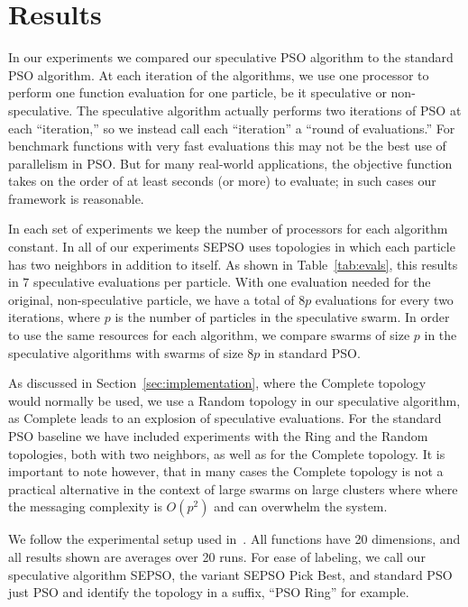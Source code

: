 \documentclass{llncs}
\renewcommand{\sec}[1]{Section~\ref{sec:#1}}
\begin{document}
\section{Results}
\label{sec:results}

In our experiments we compared our speculative PSO algorithm to the standard
PSO algorithm.  At each iteration of the algorithms, we use one processor to
perform one function evaluation for one particle, be it speculative or
non-speculative.  The speculative algorithm actually performs two iterations of
PSO at each ``iteration,'' so we instead call each ``iteration'' a ``round of
evaluations.''  For benchmark functions with very fast evaluations this may not
be the best use of parallelism in PSO.  But for many real-world applications,
the objective function takes on the order of at least seconds (or more) to
evaluate; in such cases our framework is reasonable.

In each set of experiments we keep the number of processors for each algorithm
constant.  In all of our experiments SEPSO uses topologies in which each
particle has two neighbors in addition to itself.  As shown in
Table~\ref{tab:evals}, this results in $7$ speculative evaluations per
particle.  With one evaluation needed for the original, non-speculative
particle, we have a total of $8p$ evaluations for every two iterations, where
$p$ is the number of particles in the speculative swarm.  In order to use the
same resources for each algorithm, we compare swarms of size $p$ in the
speculative algorithms with swarms of size $8p$ in standard PSO.

As discussed in \sec{implementation}, where the Complete topology would
normally be used, we use a Random topology in our speculative algorithm, as
Complete leads to an explosion of speculative evaluations.  For the standard
PSO baseline we have included experiments with the Ring and the Random
topologies, both with two neighbors, as well as for the Complete topology.  It
is important to note however, that in many cases the Complete topology is not a
practical alternative in the context of large swarms on large clusters where
where the messaging complexity is $O(p^2)$ and can overwhelm the system.

We follow the experimental setup used
in~\cite{bratton-2007-defining-a-standard-for-pso}.  All functions have 20
dimensions, and all results shown are averages over 20 runs.  For ease of
labeling, we call our speculative algorithm SEPSO, the variant SEPSO Pick Best,
and standard PSO just PSO and identify the topology in a suffix, ``PSO Ring''
for example.
\end{document}
